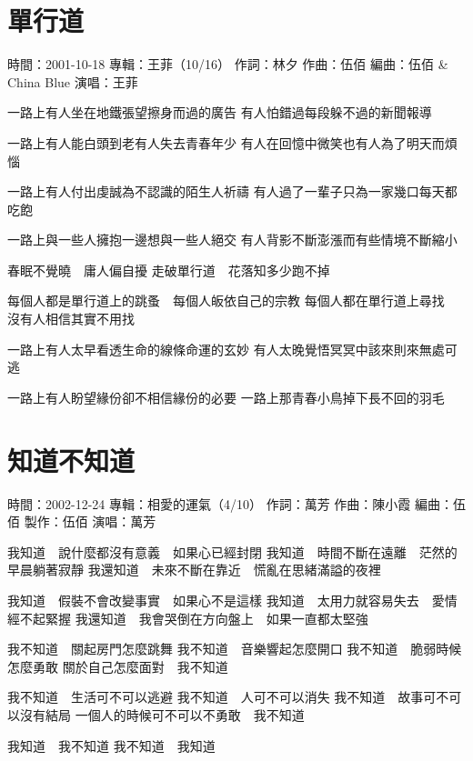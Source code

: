 \documentclass[UTF8,a4paper,oneside,twocolumn,12pt]{ctexbook}
\newcommand{\infopair}[2]{\textbullet #1：#2}
\newcommand{\zc}[1][伍佰]{\infopair{作詞}{#1}}
\newcommand{\zq}[1][伍佰]{\infopair{作曲}{#1}}
\newcommand{\bq}[1][伍佰]{\infopair{編曲}{#1}}
\newcommand{\zj}[1]{\infopair{專輯}{#1}}
\newcommand{\zz}[1]{\infopair{製作}{#1}}
\newcommand{\sj}[1]{\infopair{時間}{#1}}
\newenvironment{info}{\begin{flushleft}\kaishu
	}
	{\end{flushleft}\normalsize\yahei\par}
\newenvironment{lyric}{
	}
{}
\begin{document}
\section{單行道}
\begin{info}
	\sj{2001-10-18}
	\zj{王菲（10/16）}
	\zc[林夕]
	\zq
	\bq[伍佰 \& China Blue]
	\infopair{演唱}{王菲}
\end{info}
\begin{lyric}
	一路上有人坐在地鐵張望擦身而過的廣告
	有人怕錯過每段躲不過的新聞報導

	一路上有人能白頭到老有人失去青春年少
	有人在回憶中微笑也有人為了明天而煩惱

	一路上有人付出虔誠為不認識的陌生人祈禱
	有人過了一輩子只為一家幾口每天都吃飽

	一路上與一些人擁抱一邊想與一些人絕交
	有人背影不斷澎漲而有些情境不斷縮小

	春眠不覺曉　庸人偏自擾
	走破單行道　花落知多少跑不掉

	每個人都是單行道上的跳蚤　每個人皈依自己的宗教
	每個人都在單行道上尋找　沒有人相信其實不用找

	一路上有人太早看透生命的線條命運的玄妙
	有人太晚覺悟冥冥中該來則來無處可逃

	一路上有人盼望緣份卻不相信緣份的必要
	一路上那青春小鳥掉下長不回的羽毛
\end{lyric}

\section{知道不知道}
\begin{info}
	\sj{2002-12-24}
	\zj{相愛的運氣（4/10）}
	\zc[萬芳]
	\zq[陳小霞]
	\bq[伍佰]
	\zz{伍佰}
	\infopair{演唱}{萬芳}
\end{info}
\begin{lyric}
	我知道　說什麼都沒有意義　如果心已經封閉
	我知道　時間不斷在遠離　茫然的早晨躺著寂靜
	我還知道　未來不斷在靠近　慌亂在思緒滿謚的夜裡

	我知道　假裝不會改變事實　如果心不是這樣
	我知道　太用力就容易失去　愛情經不起緊握
	我還知道　我會哭倒在方向盤上　如果一直都太堅強

	我不知道　關起房門怎麼跳舞
	我不知道　音樂響起怎麼開口
	我不知道　脆弱時候怎麼勇敢
	關於自己怎麼面對　我不知道

	我不知道　生活可不可以逃避
	我不知道　人可不可以消失
	我不知道　故事可不可以沒有結局
	一個人的時候可不可以不勇敢　我不知道

	我知道　我不知道
	我不知道　我知道
\end{lyric}
\end{document}
